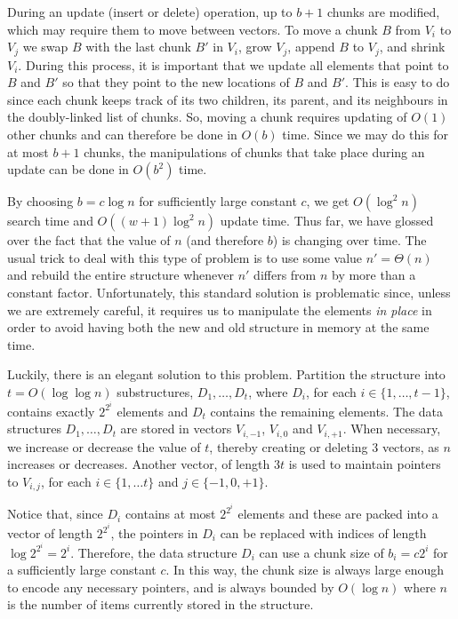During an update (insert or delete) operation, up to $b+1$ chunks are
modified, which may require them to move between vectors. To move a chunk
$B$ from $V_i$ to $V_j$ we swap $B$ with the last chunk $B'$ in $V_i$,
grow $V_j$, append $B$ to $V_j$, and shrink $V_i$.  During this process,
it is important that we update all elements that point to $B$ and $B'$
so that they point to the new locations of $B$ and $B'$.  This is easy
to do since each chunk keeps track of its two children, its parent,
and its neighbours in the doubly-linked list of chunks.  So, moving
a chunk requires updating of $O(1)$ other chunks and can therefore be
done in $O(b)$ time.  Since we may do this for at most $b+1$ chunks,
the manipulations of chunks that take place during an update can be done
in $O(b^2)$ time.

By choosing $b=c\log n$ for sufficiently large constant $c$, we get
$O(\log^2 n)$ search time and $O((w+1)\log^2 n)$ update time.  Thus far,
we have glossed over the fact that the value of $n$ (and therefore $b$)
is changing over time.  The usual trick to deal with this type of problem
is to use some value $n'=\Theta(n)$ and rebuild the entire structure
whenever $n'$ differs from $n$ by more than a constant factor.
Unfortunately, this standard solution is problematic since, unless we are
extremely careful, it requires us to manipulate the elements \emph{in
place} in order to avoid having both the new and old structure in memory at
the same time.

Luckily, there is an elegant solution to this problem.  Partition the
structure into $t=O(\log\log n)$ substructures, $D_1,\ldots,D_t$, where
$D_i$, for each $i\in\{1,\ldots,t-1\}$, contains exactly $2^{2^i}$ elements
and $D_t$ contains the remaining elements.  The data structures
$D_1,\ldots,D_t$ are stored in vectors $V_{i,-1}$, $V_{i,0}$ and
$V_{i,+1}$.  When necessary, we increase or decrease the value of $t$,
thereby creating or deleting 3 vectors, as $n$ increases or decreases.
Another vector, of length $3t$ is used to maintain pointers to $V_{i,j}$,
for each $i\in\{1,\ldots t\}$ and $j\in\{-1,0,+1\}$.

Notice that, since $D_i$ contains at most $2^{2^i}$ elements and these are
packed into a vector of length $2^{2^i}$, the pointers in $D_i$ can be
replaced with indices of length $\log 2^{2^i} = 2^i$.  Therefore, the data
structure $D_i$ can use a chunk size of $b_i=c2^i$ for a sufficiently large
constant $c$.  In this way, the chunk size is always large enough to encode
any necessary pointers, and is always bounded by $O(\log n)$ where $n$ is
the number of items currently stored in the structure.

